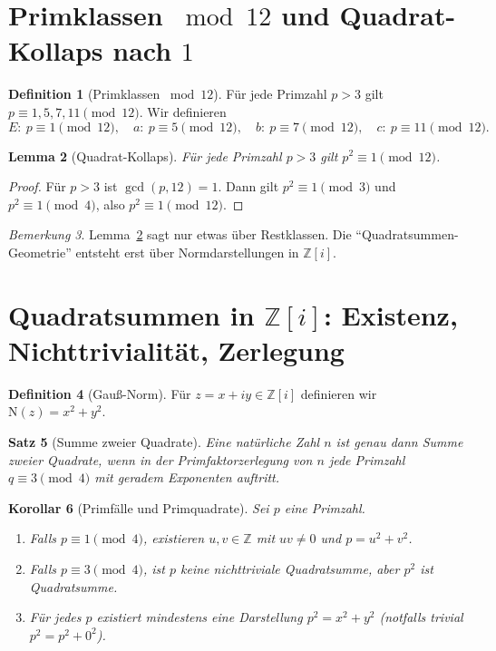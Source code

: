 \documentclass[a4paper,11pt]{article}
\newtheorem{satz}{Satz}[section]
\newtheorem{lemma}[satz]{Lemma}
\newtheorem{korollar}[satz]{Korollar}
\theoremstyle{definition}
\newtheorem{definition}[satz]{Definition}
\theoremstyle{remark}
\newtheorem{bemerkung}[satz]{Bemerkung}
\newcommand{\Z}{\mathbb{Z}}
\newcommand{\Zi}{\mathbb{Z}[i]}
\newcommand{\Norm}{\mathrm{N}}
\begin{document}
	\section{Primklassen \(\bmod 12\) und Quadrat-Kollaps nach \(1\)}
	\begin{definition}[Primklassen \(\bmod 12\)]
		Für jede Primzahl \(p>3\) gilt \(p\equiv 1,5,7,11\pmod{12}\).
		Wir definieren
		\[
		E:\ p\equiv 1\!\!\pmod{12},\quad
		a:\ p\equiv 5\!\!\pmod{12},\quad
		b:\ p\equiv 7\!\!\pmod{12},\quad
		c:\ p\equiv 11\!\!\pmod{12}.
		\]
	\end{definition}
	
	\begin{lemma}[Quadrat-Kollaps]
		\label{lem:kollaps}
		Für jede Primzahl \(p>3\) gilt \(p^2\equiv 1\pmod{12}\).
	\end{lemma}
	
	\begin{proof}
		Für \(p>3\) ist \(\gcd(p,12)=1\). Dann gilt \(p^2\equiv 1\pmod{3}\) und \(p^2\equiv 1\pmod{4}\), also \(p^2\equiv 1\pmod{12}\).
	\end{proof}
	
	\begin{bemerkung}
		Lemma~\ref{lem:kollaps} sagt nur etwas über Restklassen. Die ``Quadratsummen-Geometrie'' entsteht erst über
		Normdarstellungen in \(\Zi\).
	\end{bemerkung}
	
	\section{Quadratsummen in \(\Zi\): Existenz, Nichttrivialität, Zerlegung}
	\begin{definition}[Gauß-Norm]
		Für \(z=x+iy\in\Zi\) definieren wir \(\Norm(z)=x^2+y^2\).
	\end{definition}
	
	\begin{satz}[Summe zweier Quadrate]
		\label{thm:sos}
		Eine natürliche Zahl \(n\) ist genau dann Summe zweier Quadrate, wenn in der Primfaktorzerlegung von \(n\)
		jede Primzahl \(q\equiv 3\pmod 4\) mit \emph{geradem} Exponenten auftritt.
	\end{satz}
	
	\begin{korollar}[Primfälle und Primquadrate]
		\label{cor:primcases}
		Sei \(p\) eine Primzahl.
		\begin{enumerate}
			\item Falls \(p\equiv 1\pmod4\), existieren \(u,v\in\Z\) mit \(uv\neq 0\) und \(p=u^2+v^2\).
			\item Falls \(p\equiv 3\pmod4\), ist \(p\) keine nichttriviale Quadratsumme, aber \(p^2\) ist Quadratsumme.
			\item Für jedes \(p\) existiert mindestens eine Darstellung \(p^2=x^2+y^2\) (notfalls trivial \(p^2=p^2+0^2\)).
		\end{enumerate}
	\end{korollar}
	
\end{document}
